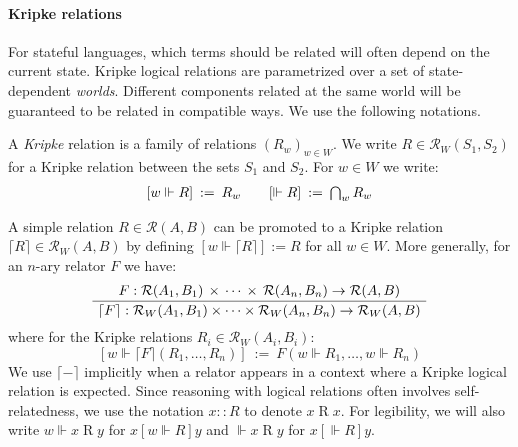 \documentclass[acmsmall,authordraft]{acmart}
\newcommand{\ifr}[1]{\mathrel{[{#1}]}}
\begin{document}

\paragraph{Kripke relations}

For stateful languages,
which terms should be related
will often depend on the current state.
Kripke logical relations
are parametrized over a set of state-dependent \emph{worlds}.
Different components related at the same world
will be guaranteed to be related in compatible ways.
We use the following notations.

\begin{definition} \label{def:klr} %
A \emph{Kripke} relation is
a family of relations $(R_w)_{w \in W}$.
We write $R \in \mathcal{R}_W(S_1, S_2)$
for a Kripke relation between the sets $S_1$ and $S_2$.
For $w \in W$ we write:
\[
\begin{array}{c@{\qquad}c}
    [w \Vdash R] \: := \: R_w &
    [\Vdash R] \: := \: \bigcap_{w} R_w
\end{array}
\]
\end{definition}

A simple relation $R \in \mathcal{R}(A, B)$
can be promoted to a Kripke relation
$\lceil R \rceil \in \mathcal{R}_W(A, B)$
by defining $[w \Vdash \lceil R \rceil] := R$ for all $w \in W$.
More generally, for an $n$-ary relator $F$ we have:
\[
  \AxiomC{$
    F :
      \mathcal{R}(A_1, B_1) \,\times\,\cdots\,\times\,\mathcal{R}(A_n, B_n)
      \rightarrow \mathcal{R}(A, B)$}
  \UnaryInfC{$
    \lceil F \rceil :
      \mathcal{R}_W(A_1, B_1) \times \cdots \times \mathcal{R}_W(A_n, B_n)
      \rightarrow \mathcal{R}_W(A, B)$}
  \DisplayProof
\]
where for the Kripke relations $R_i \in \mathcal{R}_W(A_i, B_i)$:
\[
  [w \Vdash \lceil F \rceil (R_1, \ldots, R_n)] \: := \:
    F(w \Vdash R_1, \ldots, w \Vdash R_n)
\]
We use $\lceil - \rceil$ implicitly
when a relator appears in a context where
a Kripke logical relation is expected.
Since reasoning with logical relations
often involves self-relatedness,
we use the notation
$x :: R$ to denote $x \mathrel{R} x$.
For legibility, we will also write
$w \Vdash x \mathrel{R} y$ for $x \ifr{w \Vdash R} y$
and $\Vdash x \mathrel{R} y$ for $x \ifr{\Vdash R} y$.

\end{document}
